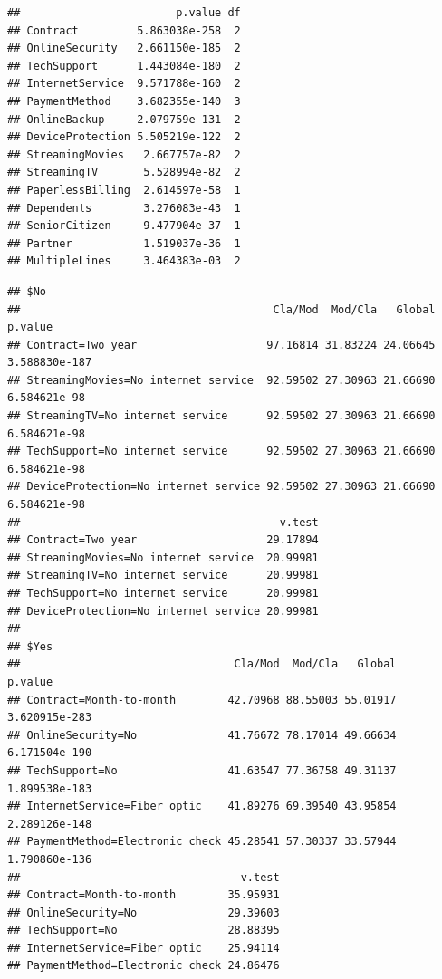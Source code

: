 \documentclass[
  twoside]{article}
\newenvironment{Shaded}{\begin{snugshade}}{\end{snugshade}}
\newcommand{\AttributeTok}[1]{\textcolor[rgb]{0.13,0.29,0.53}{#1}}
\newcommand{\DecValTok}[1]{\textcolor[rgb]{0.00,0.00,0.81}{#1}}
\newcommand{\FunctionTok}[1]{\textcolor[rgb]{0.13,0.29,0.53}{\textbf{#1}}}
\newcommand{\NormalTok}[1]{#1}
\newcommand{\SpecialCharTok}[1]{\textcolor[rgb]{0.81,0.36,0.00}{\textbf{#1}}}
\begin{document}
\begin{verbatim}
##                        p.value df
## Contract         5.863038e-258  2
## OnlineSecurity   2.661150e-185  2
## TechSupport      1.443084e-180  2
## InternetService  9.571788e-160  2
## PaymentMethod    3.682355e-140  3
## OnlineBackup     2.079759e-131  2
## DeviceProtection 5.505219e-122  2
## StreamingMovies   2.667757e-82  2
## StreamingTV       5.528994e-82  2
## PaperlessBilling  2.614597e-58  1
## Dependents        3.276083e-43  1
## SeniorCitizen     9.477904e-37  1
## Partner           1.519037e-36  1
## MultipleLines     3.464383e-03  2
\end{verbatim}

\begin{Shaded}
\end{Shaded}

\begin{verbatim}
## $No
##                                       Cla/Mod  Mod/Cla   Global       p.value
## Contract=Two year                    97.16814 31.83224 24.06645 3.588830e-187
## StreamingMovies=No internet service  92.59502 27.30963 21.66690  6.584621e-98
## StreamingTV=No internet service      92.59502 27.30963 21.66690  6.584621e-98
## TechSupport=No internet service      92.59502 27.30963 21.66690  6.584621e-98
## DeviceProtection=No internet service 92.59502 27.30963 21.66690  6.584621e-98
##                                        v.test
## Contract=Two year                    29.17894
## StreamingMovies=No internet service  20.99981
## StreamingTV=No internet service      20.99981
## TechSupport=No internet service      20.99981
## DeviceProtection=No internet service 20.99981
## 
## $Yes
##                                 Cla/Mod  Mod/Cla   Global       p.value
## Contract=Month-to-month        42.70968 88.55003 55.01917 3.620915e-283
## OnlineSecurity=No              41.76672 78.17014 49.66634 6.171504e-190
## TechSupport=No                 41.63547 77.36758 49.31137 1.899538e-183
## InternetService=Fiber optic    41.89276 69.39540 43.95854 2.289126e-148
## PaymentMethod=Electronic check 45.28541 57.30337 33.57944 1.790860e-136
##                                  v.test
## Contract=Month-to-month        35.95931
## OnlineSecurity=No              29.39603
## TechSupport=No                 28.88395
## InternetService=Fiber optic    25.94114
## PaymentMethod=Electronic check 24.86476
\end{verbatim}
\end{document}
